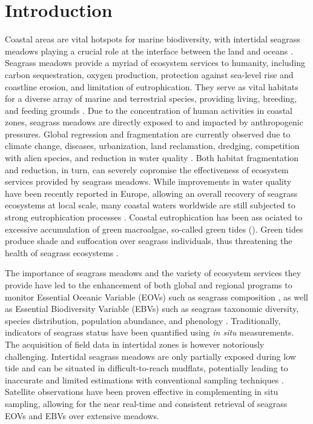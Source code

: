 \documentclass[
  number]{elsarticle}
\begin{document}
\section{Introduction}\label{introduction}

Coastal areas are vital hotspots for marine biodiversity, with
intertidal seagrass meadows playing a crucial role at the interface
between the land and oceans \citep{unsworth2022}. Seagrass meadows
provide a myriad of ecosystem services to humanity, including carbon
sequestration, oxygen production, protection against sea-level rise and
coastline erosion, and limitation of eutrophication. They serve as vital
habitats for a diverse array of marine and terrestrial species,
providing living, breeding, and feeding grounds \citetext{\citealp[
]{gardner2018}; \citealp[ ]{Zoffoli2022}; \citealp{jankowska2019}}. Due
to the concentration of human activities in coastal zones, seagrass
meadows are directly exposed to and impacted by anthropogenic pressures.
Global regression and fragmentation are currently observed due to
climate change, diseases, urbanization, land reclamation, dredging,
competition with alien species, and reduction in water quality
\citetext{\citealp[ ]{nguyen2021}; \citealp[ ]{soissons2018}; \citealp[
]{orth2006}; \citealp[ ]{lin2018}; \citealp[ ]{duffy2019}; \citealp[
]{rasheed2011long}; \citealp{chefaoui2018dramatic}}. Both habitat
fragmentation and reduction, in turn, can severely copromise the
effectiveness of ecosystem services provided by seagrass meadows. While
improvements in water quality have been recently reported in Europe,
allowing an overall recovery of seagrass ecosystems at local scale, many
coastal waters worldwide are still subjected to strong eutrophication
processes \citetext{\citealp[ ]{deSantos2019}; \citealp{Zoffoli2021}}.
Coastal eutrophication has been ass ociated to excessive accumulation of
green macroalgae, so-called green tides (\citep{devlin2023nutrients}).
Green tides produce shade and suffocation over seagrass individuals,
thus threatening the health of seagrass ecosystems \citep{wang2022}.

The importance of seagrass meadows and the variety of ecosystem services
they provide have led to the enhancement of both global and regional
programs to monitor Essential Oceanic Variable (EOVs) such as seagrass
composition \citep{Miloslavich2018}, as well as Essential Biodiversity
Variable (EBVs) such as seagrass taxonomic diversity, species
distribution, population abundance, and phenology \citep{Pereira2013}.
Traditionally, indicators of seagrass status have been quantified using
\emph{in situ} measurements. The acquisition of field data in intertidal
zones is however notoriously challenging. Intertidal seagrass meadows
are only partially exposed during low tide and can be situated in
difficult-to-reach mudflats, potentially leading to inaccurate and
limited estimations with conventional sampling techniques
\citep{nijland2019}. Satellite observations have been proven effective
in complementing in situ sampling, allowing for the near real-time and
consistent retrieval of seagrass EOVs and EBVs over extensive meadows.
\citetext{\citealp[ ]{Zoffoli2021}; \citealp[ ]{xu2021}; \citealp[
]{Traganos2018}; \citealp{coffer2023}}
\end{document}
